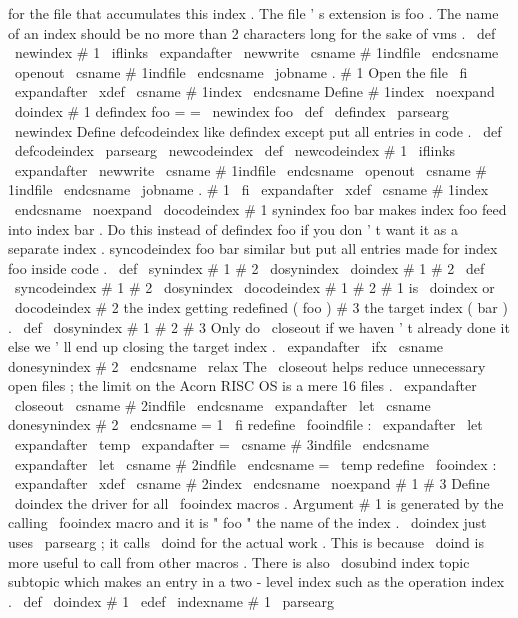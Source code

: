 {{{for
%
the
file
that
accumulates
this
index
.
The
file
'
s
extension
is
foo
.
%
The
name
of
an
index
should
be
no
more
than
2
characters
long
%
for
the
sake
of
vms
.
%
\
def
\
newindex
#
1
{
%
\
iflinks
\
expandafter
\
newwrite
\
csname
#
1indfile
\
endcsname
\
openout
\
csname
#
1indfile
\
endcsname
\
jobname
.
#
1
%
Open
the
file
\
fi
\
expandafter
\
xdef
\
csname
#
1index
\
endcsname
{
%
%
Define
#
1index
\
noexpand
\
doindex
{
#
1
}
}
}
%
defindex
foo
=
=
\
newindex
{
foo
}
%
\
def
\
defindex
{
\
parsearg
\
newindex
}
%
Define
defcodeindex
like
defindex
except
put
all
entries
in
code
.
%
\
def
\
defcodeindex
{
\
parsearg
\
newcodeindex
}
%
\
def
\
newcodeindex
#
1
{
%
\
iflinks
\
expandafter
\
newwrite
\
csname
#
1indfile
\
endcsname
\
openout
\
csname
#
1indfile
\
endcsname
\
jobname
.
#
1
\
fi
\
expandafter
\
xdef
\
csname
#
1index
\
endcsname
{
%
\
noexpand
\
docodeindex
{
#
1
}
}
%
}
%
synindex
foo
bar
makes
index
foo
feed
into
index
bar
.
%
Do
this
instead
of
defindex
foo
if
you
don
'
t
want
it
as
a
separate
index
.
%
%
syncodeindex
foo
bar
similar
but
put
all
entries
made
for
index
foo
%
inside
code
.
%
\
def
\
synindex
#
1
#
2
{
\
dosynindex
\
doindex
{
#
1
}
{
#
2
}
}
\
def
\
syncodeindex
#
1
#
2
{
\
dosynindex
\
docodeindex
{
#
1
}
{
#
2
}
}
%
#
1
is
\
doindex
or
\
docodeindex
#
2
the
index
getting
redefined
(
foo
)
%
#
3
the
target
index
(
bar
)
.
\
def
\
dosynindex
#
1
#
2
#
3
{
%
%
Only
do
\
closeout
if
we
haven
'
t
already
done
it
else
we
'
ll
end
up
%
closing
the
target
index
.
\
expandafter
\
ifx
\
csname
donesynindex
#
2
\
endcsname
\
relax
%
The
\
closeout
helps
reduce
unnecessary
open
files
;
the
limit
on
the
%
Acorn
RISC
OS
is
a
mere
16
files
.
\
expandafter
\
closeout
\
csname
#
2indfile
\
endcsname
\
expandafter
\
let
\
csname
donesynindex
#
2
\
endcsname
=
1
\
fi
%
redefine
\
fooindfile
:
\
expandafter
\
let
\
expandafter
\
temp
\
expandafter
=
\
csname
#
3indfile
\
endcsname
\
expandafter
\
let
\
csname
#
2indfile
\
endcsname
=
\
temp
%
redefine
\
fooindex
:
\
expandafter
\
xdef
\
csname
#
2index
\
endcsname
{
\
noexpand
#
1
{
#
3
}
}
%
}
%
Define
\
doindex
the
driver
for
all
\
fooindex
macros
.
%
Argument
#
1
is
generated
by
the
calling
\
fooindex
macro
%
and
it
is
"
foo
"
the
name
of
the
index
.
%
\
doindex
just
uses
\
parsearg
;
it
calls
\
doind
for
the
actual
work
.
%
This
is
because
\
doind
is
more
useful
to
call
from
other
macros
.
%
There
is
also
\
dosubind
{
index
}
{
topic
}
{
subtopic
}
%
which
makes
an
entry
in
a
two
-
level
index
such
as
the
operation
index
.
\
def
\
doindex
#
1
{
\
edef
\
indexname
{
#
1
}
\
parsearg
}}}}
